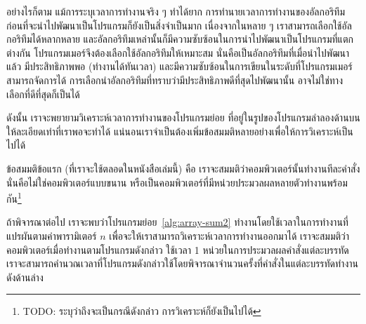 อย่างไรก็ตาม แม้{\wbr}การ{\wbr}ระบุ{\wbr}เวลา{\wbr}การ{\wbr}ทำงาน{\wbr}จริง ๆ ทำ{\wbr}ได้{\wbr}ยาก{\wbr}
การ{\wbr}ทำนาย{\wbr}เวลา{\wbr}การ{\wbr}ทำงาน{\wbr}ของ{\wbr}อัล{\wbr}กอ{\wbr}ริ{\wbr}ทึม{\wbr}ก่อน{\wbr}ที่{\wbr}จะ{\wbr}นำ{\wbr}ไป{\wbr}พัฒนา{\wbr}เป็น{\wbr}โปรแกรม{\wbr}ก็{\wbr}ยัง{\wbr}เป็น{\wbr}สิ่ง{\wbr}จำเป็น{\wbr}มาก{\wbr}
เนื่องจาก{\wbr}ใน{\wbr}หลาย ๆ เรา{\wbr}สามารถ{\wbr}เลือก{\wbr}ใช้{\wbr}อัล{\wbr}กอ{\wbr}ริ{\wbr}ทึม{\wbr}ได้{\wbr}หลากหลาย{\wbr}
และ{\wbr}อัล{\wbr}กอ{\wbr}ริ{\wbr}ทึม{\wbr}เหล่านั้น{\wbr}ก็{\wbr}มี{\wbr}ความ{\wbr}ซับซ้อน{\wbr}ใน{\wbr}การ{\wbr}นำ{\wbr}ไป{\wbr}พัฒนา{\wbr}เป็น{\wbr}โปรแกรม{\wbr}ที่{\wbr}แตกต่าง{\wbr}กัน{\wbr}
โปรแกรมเมอร์{\wbr}จึง{\wbr}ต้อง{\wbr}เลือก{\wbr}ใช้{\wbr}อัล{\wbr}กอ{\wbr}ริ{\wbr}ทึม{\wbr}ให้{\wbr}เหมาะสม นั่น{\wbr}คือ{\wbr}เป็น{\wbr}อัล{\wbr}กอ{\wbr}ริ{\wbr}ทึม{\wbr}ที่{\wbr}เมื่อ{\wbr}นำ{\wbr}ไป{\wbr}พัฒนา{\wbr}แล้ว{\wbr}
มี{\wbr}ประสิทธิภาพ{\wbr}พอ (ทำงาน{\wbr}ได้{\wbr}ทัน{\wbr}เวลา)
และ{\wbr}มี{\wbr}ความ{\wbr}ซับซ้อน{\wbr}ใน{\wbr}การ{\wbr}เขียน{\wbr}ใน{\wbr}ระดับ{\wbr}ที่{\wbr}โปรแกรมเมอร์{\wbr}สามารถ{\wbr}จัดการ{\wbr}ได้{\wbr}
การ{\wbr}เลือก{\wbr}นำ{\wbr}อัล{\wbr}กอ{\wbr}ริ{\wbr}ทึม{\wbr}ที่{\wbr}ทราบ{\wbr}ว่า{\wbr}มี{\wbr}ประสิทธิภาพ{\wbr}ดี{\wbr}ที่สุด{\wbr}ไป{\wbr}พัฒนา{\wbr}นั้น{\wbr}
อาจ{\wbr}ไม่{\wbr}ใช่{\wbr}ทางเลือก{\wbr}ที่{\wbr}ดี{\wbr}ที่สุด{\wbr}ก็{\wbr}เป็น{\wbr}ได้{\wbr}

ดังนั้น เรา{\wbr}จะ{\wbr}พยายาม{\wbr}วิเคราะห์{\wbr}เวลา{\wbr}การ{\wbr}ทำงาน{\wbr}ของ{\wbr}โปรแกรมย่อย{\wbr}
ที่อยู่{\wbr}ใน{\wbr}รูป{\wbr}ของ{\wbr}โปรแกรม{\wbr}ลำ{\wbr}ลอง{\wbr}ด้าน{\wbr}บน ให้{\wbr}ละเอียด{\wbr}เท่า{\wbr}ที่{\wbr}เรา{\wbr}พอจะ{\wbr}ทำ{\wbr}ได้{\wbr}
แน่นอน{\wbr}เรา{\wbr}จำเป็น{\wbr}ต้อง{\wbr}เพิ่ม{\wbr}ข้อสมมติ{\wbr}หลาย{\wbr}อย่าง{\wbr}เพื่อให้{\wbr}การ{\wbr}วิเคราะห์{\wbr}เป็น{\wbr}ไป{\wbr}ได้{\wbr}

ข้อสมมติ{\wbr}ข้อ{\wbr}แรก (ที่{\wbr}เรา{\wbr}จะ{\wbr}ใช้{\wbr}ตลอด{\wbr}ใน{\wbr}หนังสือ{\wbr}เล่ม{\wbr}นี้) คือ{\wbr}
เรา{\wbr}จะ{\wbr}สมมติ{\wbr}ว่า{\wbr}คอมพิวเตอร์{\wbr}นั้น{\wbr}ทำงาน{\wbr}ทีละ{\wbr}คำสั่ง นั่น{\wbr}คือ{\wbr}ไม่{\wbr}ใช่{\wbr}คอมพิวเตอร์{\wbr}แบบ{\wbr}ขนาน{\wbr}
หรือ{\wbr}เป็น{\wbr}คอมพิวเตอร์{\wbr}ที่{\wbr}มี{\wbr}หน่วย{\wbr}ประมวลผล{\wbr}หลาย{\wbr}ตัว{\wbr}ทำงาน{\wbr}พร้อมกัน\footnote{TODO:
  ระบุ{\wbr}ว่า{\wbr}ถึง{\wbr}จะ{\wbr}เป็น{\wbr}กรณี{\wbr}ดังกล่าว การ{\wbr}วิเคราะห์{\wbr}ก็{\wbr}ยัง{\wbr}เป็น{\wbr}ไป{\wbr}ได้}

ถ้า{\wbr}พิจารณา{\wbr}ต่อไป เรา{\wbr}จะ{\wbr}พบ{\wbr}ว่า{\wbr}โปรแกรมย่อย~\ref{alg:array-sum2}
ทำงาน{\wbr}โดย{\wbr}ใช้เวลา{\wbr}ใน{\wbr}การ{\wbr}ทำงาน{\wbr}ที่{\wbr}แปรผัน{\wbr}ตาม{\wbr}ค่า{\wbr}พารามิเตอร์ $n$
เพื่อ{\wbr}จะ{\wbr}ให้{\wbr}เรา{\wbr}สามารถ{\wbr}วิเคราะห์{\wbr}เวลา{\wbr}การ{\wbr}ทำงาน{\wbr}ออก{\wbr}มา{\wbr}ได้{\wbr}
เรา{\wbr}จะ{\wbr}สมมติ{\wbr}ว่า{\wbr}คอมพิวเตอร์{\wbr}เมื่อ{\wbr}ทำงาน{\wbr}ตาม{\wbr}โปรแกรม{\wbr}ดังกล่าว ใช้เวลา 1
หน่วย{\wbr}ใน{\wbr}การ{\wbr}ประมวลผล{\wbr}คำสั่ง{\wbr}แต่ละ{\wbr}บรรทัด{\wbr}
เรา{\wbr}จะ{\wbr}สามารถ{\wbr}คำนวณ{\wbr}เวลา{\wbr}ที่{\wbr}โปรแกรม{\wbr}ดังกล่าว{\wbr}ใช้{\wbr}โดย{\wbr}พิจารณา{\wbr}จำนวน{\wbr}ครั้ง{\wbr}ที่{\wbr}คำสั่ง{\wbr}ใน{\wbr}แต่ละ{\wbr}บรรทัด{\wbr}ทำงาน{\wbr}
ดัง{\wbr}ด้าน{\wbr}ล่าง{\wbr}

